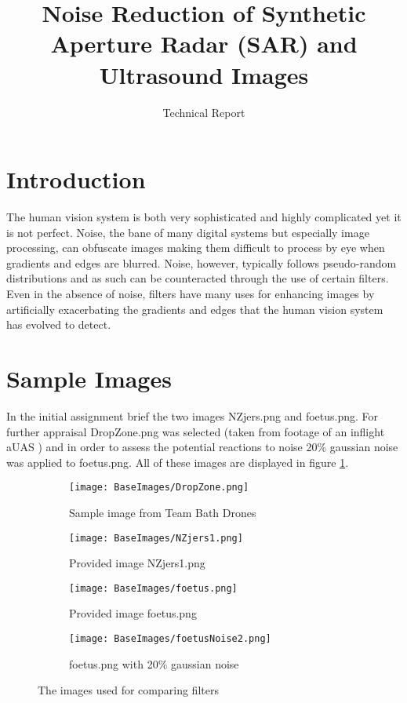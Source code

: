 \documentclass{article}
\title{Noise Reduction of Synthetic Aperture Radar (SAR) and Ultrasound Images}
\subtitle{Technical Report}
\begin{document}
\maketitleBTH

\section{Introduction}
The human vision system is both very sophisticated and highly complicated yet it is not perfect. Noise, the bane of many digital systems but especially image processing, can obfuscate images making them difficult to process by eye when gradients and edges are blurred. Noise, however, typically follows pseudo-random distributions and as such can be counteracted through the use of certain filters. Even in the absence of noise, filters have many uses for enhancing images by artificially exacerbating the gradients and edges that the human vision system has evolved to detect.  


\section{Sample Images}
In the initial assignment brief the two images NZjers.png and foetus.png\cite{Evans:aa}. For further appraisal DropZone.png was selected (taken from footage of an inflight aUAS \cite{Thomas:aa}) and in order to assess the potential reactions to noise 20\% gaussian noise was applied to foetus.png. All of these images are displayed in figure \ref{fig:newPic}.


\begin{figure}[h]
\begin{subfigure}{.5\textwidth}
	\centering
	\texttt{[image: BaseImages/DropZone.png]}
	\caption{Sample image from Team Bath Drones}	
\end{subfigure}
\hfill
\begin{subfigure}{.5\textwidth}
	\centering
	\texttt{[image: BaseImages/NZjers1.png]}
	\caption{Provided image NZjers1.png}	
\end{subfigure}


\begin{subfigure}{.5\textwidth}
	\centering
	\texttt{[image: BaseImages/foetus.png]}
	\caption{Provided image foetus.png}	
\end{subfigure}
\hfill
\begin{subfigure}{.5\textwidth}
	\centering
	\texttt{[image: BaseImages/foetusNoise2.png]}
	\caption{foetus.png with 20\% gaussian noise}	
\end{subfigure}

\caption{The images used for comparing filters}
\label{fig:newPic}
	
\end{figure}
\end{document}

